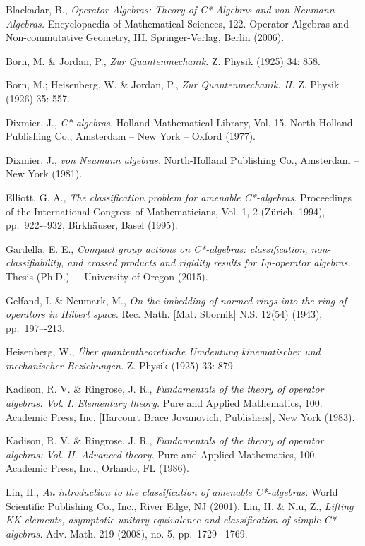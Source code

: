 \documentclass[12pt,a4paper]{amsart}
\theoremstyle{plain}
\theoremstyle{definition}
\begin{document}
\begin{thebibliography}{00}
	Blackadar, B.,
	\emph{Operator Algebras: Theory of C*-Algebras and von Neumann Algebras.}
	Encyclopaedia of Mathematical Sciences, 122. Operator Algebras and Non-commutative Geometry, III. Springer-Verlag, Berlin (2006).
	
	Born, M. \& Jordan, P.,
	\emph{Zur Quantenmechanik.}
	Z. Physik (1925) 34: 858.
	
	Born, M.; Heisenberg, W. \& Jordan, P.,
	\emph{Zur Quantenmechanik. II.}
	Z. Physik (1926) 35: 557.

	Dixmier, J.,
	\emph{C*-algebras.}
	Holland Mathematical Library, Vol. 15. North-Holland Publishing Co., Amsterdam -- New York -- Oxford (1977).

	Dixmier, J.,
	\emph{von Neumann algebras.}
	North-Holland Publishing Co., Amsterdam -- New York (1981).
		
	Elliott, G. A.,
	\emph{The classification problem for amenable C*-algebras.}
	Proceedings of the International Congress of Mathematicians, Vol. 1, 2 (Z\"{u}rich, 1994), pp.~922-–932, Birkhäuser, Basel (1995).

	Gardella, E. E.,
	\emph{Compact group actions on C*-algebras: classification, non-classifiability, and crossed products and rigidity results for Lp-operator algebras. }
	Thesis (Ph.D.) -– University of Oregon (2015).

	Gelfand, I. \& Neumark, M.,
	\emph{On the imbedding of normed rings into the ring of operators in Hilbert space.}
	Rec. Math. [Mat. Sbornik] N.S. 12(54) (1943), pp.~197–-213.

	Heisenberg, W.,
	\emph{{\"U}ber quantentheoretische Umdeutung kinematischer und mechanischer Beziehungen.}
	Z. Physik (1925) 33: 879. 
	
	Kadison, R. V. \& Ringrose, J. R.,
	\emph{Fundamentals of the theory of operator algebras: Vol. I. Elementary theory.}
	Pure and Applied Mathematics, 100. Academic Press, Inc. [Harcourt Brace Jovanovich, Publishers], New York (1983).

	Kadison, R. V. \& Ringrose, J. R.,
	\emph{Fundamentals of the theory of operator algebras: Vol. II. Advanced theory.}
	Pure and Applied Mathematics, 100. Academic Press, Inc., Orlando, FL (1986).
	
	Lin, H.,
	\emph{An introduction to the classification of amenable C*-algebras.}
	World Scientific Publishing Co., Inc., River Edge, NJ (2001).
	Lin, H. \& Niu, Z.,
	\emph{Lifting KK-elements, asymptotic unitary equivalence and classification of simple C*-algebras.}
	Adv. Math. 219 (2008), no. 5, pp.~1729-–1769. 
	

\end{thebibliography}
\end{document}
